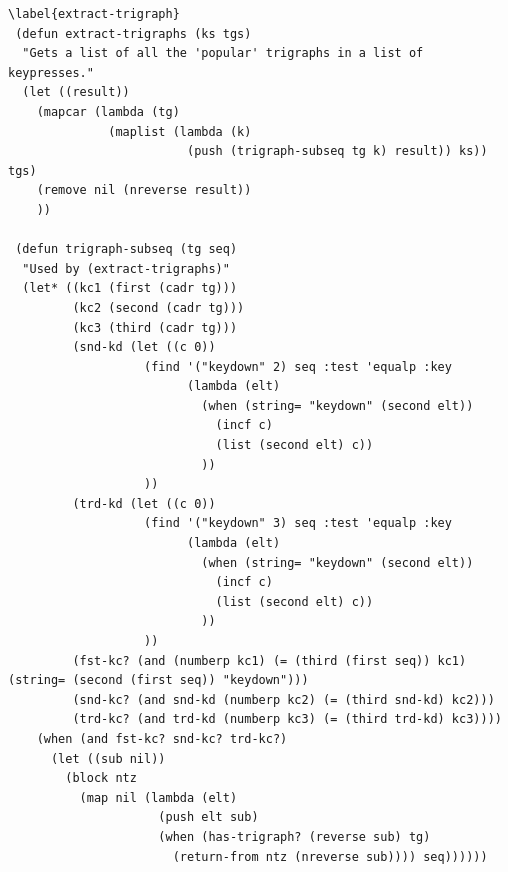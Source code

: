 \begin{lstlisting}[frame=single]
\label{extract-trigraph}
 (defun extract-trigraphs (ks tgs)
  "Gets a list of all the 'popular' trigraphs in a list of keypresses."
  (let ((result))
    (mapcar (lambda (tg)
              (maplist (lambda (k)
                         (push (trigraph-subseq tg k) result)) ks)) tgs)
    (remove nil (nreverse result))
    ))

 (defun trigraph-subseq (tg seq)
  "Used by (extract-trigraphs)"
  (let* ((kc1 (first (cadr tg)))
         (kc2 (second (cadr tg)))
         (kc3 (third (cadr tg)))
         (snd-kd (let ((c 0))
                   (find '("keydown" 2) seq :test 'equalp :key 
                         (lambda (elt)
                           (when (string= "keydown" (second elt))
                             (incf c)
                             (list (second elt) c))
                           ))
                   ))
         (trd-kd (let ((c 0))
                   (find '("keydown" 3) seq :test 'equalp :key 
                         (lambda (elt)
                           (when (string= "keydown" (second elt))
                             (incf c)
                             (list (second elt) c))
                           ))
                   ))
         (fst-kc? (and (numberp kc1) (= (third (first seq)) kc1) (string= (second (first seq)) "keydown")))
         (snd-kc? (and snd-kd (numberp kc2) (= (third snd-kd) kc2)))
         (trd-kc? (and trd-kd (numberp kc3) (= (third trd-kd) kc3))))
    (when (and fst-kc? snd-kc? trd-kc?)
      (let ((sub nil))
        (block ntz
          (map nil (lambda (elt)
                     (push elt sub)
                     (when (has-trigraph? (reverse sub) tg)
                       (return-from ntz (nreverse sub)))) seq))))))


\end{lstlisting}
